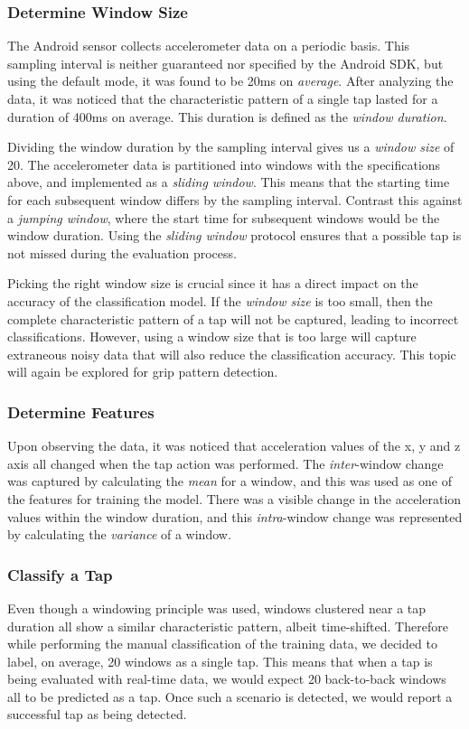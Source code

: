 \subsubsection{Determine Window Size}
The Android sensor collects accelerometer data on a periodic basis. This sampling interval is neither guaranteed nor specified by the Android SDK, but using the default mode, it was found to be 20ms on \textit{average}. After analyzing the data, it was noticed that the characteristic pattern of a single tap lasted for a duration of 400ms on average. This duration is defined as the \textit{window duration}.
\par
Dividing the window duration by the sampling interval gives us a \textit{window size} of 20. The accelerometer data is partitioned into windows with the specifications above, and implemented as a \textit{sliding window}. This means that the starting time for each subsequent window differs by the sampling interval. Contrast this against a \textit{jumping window}, where the start time for subsequent windows would be the window duration. Using the \textit{sliding window} protocol ensures that a possible tap is not missed during the evaluation process.
\par
Picking the right window size is crucial since it has a direct impact on the accuracy of the classification model. If the \textit{window size} is too small, then the complete characteristic pattern of a tap will not be captured, leading to incorrect classifications. However, using a window size that is too large will capture extraneous noisy data that will also reduce the classification accuracy. This topic will again be explored for grip pattern detection.

\subsubsection{Determine Features}
Upon observing the data, it was noticed that acceleration values of the x, y and z axis all changed when the tap action was performed. The \textit{inter}-window change was captured by calculating the \textit{mean} for a window, and this was used as one of the features for training the model. There was a visible change in the acceleration values within the window duration, and this \textit{intra}-window change was represented by calculating the \textit{variance} of a window.

\subsubsection{Classify a Tap}
Even though a windowing principle was used, windows clustered near a tap duration all show a similar characteristic pattern, albeit time-shifted. Therefore while performing the manual classification of the training data, we decided to label, on average, 20 windows as a single tap. This means that when a tap is being evaluated with real-time data, we would expect 20 back-to-back windows all to be predicted as a tap. Once such a scenario is detected, we would report a successful tap as being detected.

